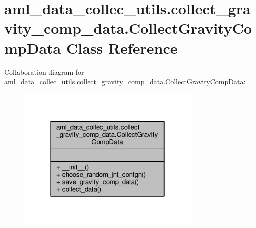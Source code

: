 \hypertarget{classaml__data__collec__utils_1_1collect__gravity__comp__data_1_1_collect_gravity_comp_data}{\section{aml\-\_\-data\-\_\-collec\-\_\-utils.\-collect\-\_\-gravity\-\_\-comp\-\_\-data.\-Collect\-Gravity\-Comp\-Data Class Reference}
\label{classaml__data__collec__utils_1_1collect__gravity__comp__data_1_1_collect_gravity_comp_data}
}


Collaboration diagram for aml\-\_\-data\-\_\-collec\-\_\-utils.\-collect\-\_\-gravity\-\_\-comp\-\_\-data.\-Collect\-Gravity\-Comp\-Data\-:\nopagebreak
\begin{figure}[H]
\begin{center}
\leavevmode
\includegraphics[width=250pt]{classaml__data__collec__utils_1_1collect__gravity__comp__data_1_1_collect_gravity_comp_data__coll__graph}
\end{center}
\end{figure}
